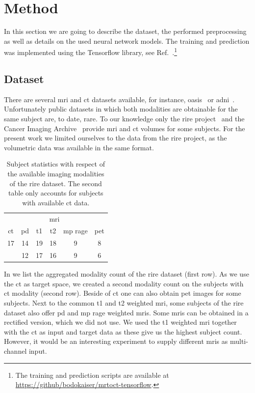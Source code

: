 \section{Method}

In this section we are going to describe the dataset, the performed
preprocessing as well as details on the used neural network models. The
training and prediction was implemented using the Tensorflow library, see
Ref.~\cite{Tensorflow15}.\footnote{The training and prediction scripts are
available at \url{https://github/bodokaiser/mrtoct-tensorflow}.}

\subsection{Dataset}

There are several \gls{mri} and \gls{ct} datasets available, for
instance, \gls{oasis}~\cite{OASIS} or \gls{adni}~\cite{ADNI}. Unfortunately
public datasets in which both modalities are obtainable for the same subject
are, to date, rare. To our knowledge only the \gls{rire} project~\cite{RIRE}
and the Cancer Imaging Archive~\cite{CIA} provide \gls{mri} and \gls{ct}
volumes for some subjects. For the present work we limited ourselves to the
data from the \gls{rire} project, as the volumetric data was available in the
same format.
\begin{table}[h]
  \centering
  \begin{tabular}{*{6}{c}}
    \toprule
    & \multicolumn{4}{c}{\acrshort{mri}}
		& \\
   	\cmidrule{2-5}
    \acrshort{ct} &
		\acrshort{pd} &
		\acrshort{t1} &
		\acrshort{t2} &
		\acrshort{mp} \acrshort{rage} &
		\acrshort{pet} \\
    \midrule
    \num{17} & \num{14} & \num{19} & \num{18} & \num{9} & \num{8} \\
             & \num{12} & \num{17} & \num{16} & \num{9} & \num{6} \\
    \bottomrule
  \end{tabular}
  \caption{Subject statistics with respect of the available imaging
    modalities of the \gls{rire} dataset. The second table only accounts for
    subjects with available \gls{ct} data.
  }\label{tab:rire}
\end{table}
In  we list the aggregated modality count of the \gls{rire}
dataset (first row). As we use the \gls{ct} as target space, we created a
second modality count on the subjects with \gls{ct} modality (second row).
Beside of \gls{ct} one can also obtain \gls{pet} images for some subjects.
Next to the common \gls{t1} and \gls{t2} weighted \gls{mri}, some subjects of
the \gls{rire} dataset also offer \gls{pd} and \gls{mp} \gls{rage} weighted
\gls{mri}s. Some \gls{mri}s can be obtained in a rectified version, which we
did not use. We used the \gls{t1} weighted \gls{mri} together with the
\gls{ct} as input and target data as these give us the highest subject count.
However, it would be an interesting experiment to supply different \gls{mri}s
as multi-channel input.

